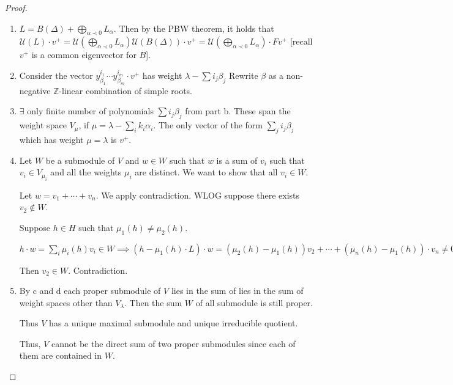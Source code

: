 \documentclass{article}
\theoremstyle{definition}
\begin{document}
    \begin{proof}
        \begin{enumerate}[label=\alph*)]
            \item \(L = B(\Delta) + \bigoplus_{\alpha \prec 0} L_\alpha\). Then by the PBW theorem, it holds that \(\mathcal{U}(L)\cdot v^+ = \mathcal{U} \left( \bigoplus_{\alpha \prec 0} L_{\alpha} \right) \mathcal{U} \left( B(\Delta) \right) \cdot v^+ = \mathcal{U} \left( \bigoplus_{\alpha \prec 0} L_\alpha \right) \cdot F v^+\) [recall \(v^+\) is a common eigenvector for \(B\)].
            \item Consider the vector \(y_{\beta_1}^{i_1} \cdots y_{\beta_m}^{i_m} \cdot v^+\) has weight \(\lambda - \sum i_j \beta_j\) Rewrite \(\beta\) as  a non-negative \(\mathbb{Z}\)-linear combination of simple roots.
            \item \(\exists\) only finite number of polynomials \(\sum i_j \beta_j\) from part b. These span the weight space \(V_\mu\), if \(\mu = \lambda - \sum_{i} k_i \alpha_i\). The only vector of the form \(\sum_{j} i_j \beta_j\) which has weight \(\mu = \lambda\) is \(v^+\).
            \item Let \(W\) be a submodule of \(V\) and \(w\in W\) such that \(w\) is a sum of \(v_i\) such that \(v_i \in V_{\mu_i}\) and all the weights \(\mu_i\) are distinct. We want to show that all \(v_i \in W\).
            
            Let \(w = v_1 + \cdots + v_n\). We apply contradiction. WLOG suppose there exists \(v_2 \notin W\).
            
            Suppose \(h\in H\) such that \(\mu_1(h)\neq \mu_2(h)\).

            \(h \cdot w=\sum_{i} \mu_i(h)v_i \in W \implies (h - \mu_1(h)\cdot L)\cdot w=(\mu_2(h)-\mu_1(h))v_2 + \cdots  + (\mu_n(h) - \mu_1(h))\cdot v_n \neq 0\)
            
            Then \(v_2 \in W\). Contradiction.

            \item By c and d each proper submodule of \(V\) lies in the sum of lies in the sum of weight spaces other than \(V_\lambda\). Then the sum \(W\) of all submodule is still proper.
            
            Thus \(V\) has a unique maximal submodule and unique irreducible quotient.

            Thus, \(V\) cannot be the direct sum of two proper submodules since each of them are contained in \(W\).
        \end{enumerate} 
    \end{proof}
\end{document}
